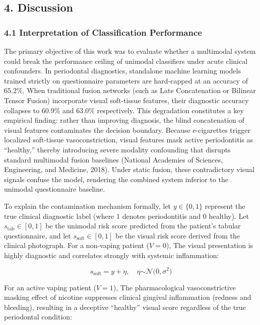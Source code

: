 \documentclass[
]{article}
\begin{document}
\subsection{\texorpdfstring{\textbf{4.
Discussion}}{4. Discussion}}\label{discussion}

\subsubsection{\texorpdfstring{\textbf{4.1 Interpretation of
Classification
Performance}}{4.1 Interpretation of Classification Performance}}\label{interpretation-of-classification-performance}

The primary objective of this work was to evaluate whether a multimodal
system could break the performance ceiling of unimodal classifiers under
acute clinical confounders. In periodontal diagnostics, standalone
machine learning models trained strictly on questionnaire parameters are
hard-capped at an accuracy of \(65.2\%\). When traditional fusion
networks (such as Late Concatenation or Bilinear Tensor Fusion)
incorporate visual soft-tissue features, their diagnostic accuracy
collapses to \(60.9\%\) and \(63.0\%\) respectively. This degradation
constitutes a key empirical finding: rather than improving diagnosis,
the blind concatenation of visual features contaminates the decision
boundary. Because e-cigarettes trigger localized soft-tissue
vasoconstriction, visual features mask active periodontitis as
``healthy,'' thereby introducing severe modality confounding that
disrupts standard multimodal fusion baselines (National Academies of
Sciences, Engineering, and Medicine, 2018). Under static fusion, these
contradictory visual signals confuse the model, rendering the combined
system inferior to the unimodal questionnaire baseline.

To explain the contamination mechanism formally, let \(y \in \{ 0,1\}\)
represent the true clinical diagnostic label (where \(1\) denotes
periodontitis and \(0\) healthy). Let \(s_{\text{tab}} \in [ 0,1]\) be
the unimodal risk score predicted from the patient's tabular
questionnaire, and let \(s_{\text{soft}} \in [ 0,1]\) be the visual risk
score derived from the clinical photograph. For a non-vaping patient
(\(V = 0\)), The visual presentation is highly diagnostic and correlates
strongly with systemic inflammation:

\[s_{\text{soft}} = y + \eta,\quad\eta\mathcal{\sim N(}0,\sigma^{2})\]

For an active vaping patient (\(V = 1\)), The pharmacological
vasoconstrictive masking effect of nicotine suppresses clinical gingival
inflammation (redness and bleeding), resulting in a deceptive
``healthy'' visual score regardless of the true periodontal condition:
\end{document}
